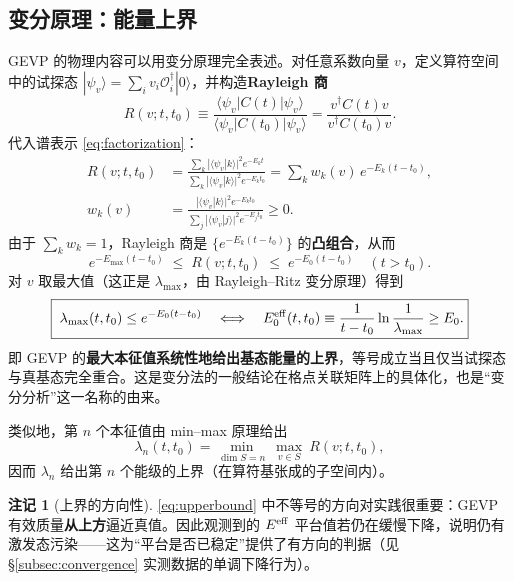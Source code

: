 \documentclass[12pt,a4paper]{ctexart}
\theoremstyle{definition}
\newtheorem{remark}{注记}[section]
\newcommand{\dagg}{\dagger}
\begin{document}
\subsection{变分原理：能量上界}\label{subsec:variational}

GEVP 的物理内容可以用变分原理完全表述。对任意系数向量 $v$，定义算符空间中的试探态 $|\psi_v\rangle = \sum_i v_i \mathcal{O}_i^\dagg|0\rangle$，并构造\textbf{Rayleigh 商}
\begin{equation}
R(v;t,t_0) \equiv \frac{\langle \psi_v | C(t) | \psi_v\rangle}{\langle \psi_v | C(t_0) | \psi_v\rangle}
= \frac{v^\dagg C(t) v}{v^\dagg C(t_0) v} .
\label{eq:rayleigh}
\end{equation}
代入谱表示 \eqref{eq:factorization}：
\begin{equation}
\begin{split}
R(v;t,t_0) &= \frac{\sum_k |\langle \psi_v|k\rangle|^2 e^{-E_k t}}{\sum_k |\langle \psi_v|k\rangle|^2 e^{-E_k t_0}}
= \sum_k w_k(v)\, e^{-E_k (t-t_0)},\\
w_k(v) &= \frac{|\langle \psi_v|k\rangle|^2 e^{-E_k t_0}}{\sum_j |\langle \psi_v|j\rangle|^2 e^{-E_j t_0}} \ge 0 .
\end{split}
\label{eq:convex}
\end{equation}
由于 $\sum_k w_k = 1$，Rayleigh 商是 $\{e^{-E_k(t-t_0)}\}$ 的\textbf{凸组合}，从而
\begin{equation}
e^{-E_{\max}(t-t_0)} \;\le\; R(v;t,t_0) \;\le\; e^{-E_0(t-t_0)} \quad (t>t_0).
\end{equation}
对 $v$ 取最大值（这正是 $\lambda_{\max}$，由 Rayleigh--Ritz 变分原理）得到
\begin{equation}
\boxed{\;\lambda_{\max}(t,t_0) \le e^{-E_0 (t-t_0)}
\quad\Longleftrightarrow\quad
E_0^{\rm eff}(t,t_0) \equiv \frac{1}{t-t_0}\ln\frac{1}{\lambda_{\max}} \ge E_0 .}
\label{eq:upperbound}
\end{equation}
即 GEVP 的\textbf{最大本征值系统性地给出基态能量的上界}，等号成立当且仅当试探态与真基态完全重合。这是变分法的一般结论在格点关联矩阵上的具体化，也是``变分分析''这一名称的由来。

类似地，第 $n$ 个本征值由 min--max 原理给出
\begin{equation}
\lambda_n(t,t_0) = \min_{\dim S = n}\ \max_{v\in S}\ R(v;t,t_0),
\end{equation}
因而 $\lambda_n$ 给出第 $n$ 个能级的上界（在算符基张成的子空间内）。

\begin{remark}[上界的方向性]
\eqref{eq:upperbound} 中不等号的方向对实践很重要：GEVP 有效质量\textbf{从上方}逼近真值。因此观测到的 $E^{\rm eff}$ 平台值若仍在缓慢下降，说明仍有激发态污染——这为``平台是否已稳定''提供了有方向的判据（见 §\ref{subsec:convergence} 实测数据的单调下降行为）。
\end{remark}
\end{document}
